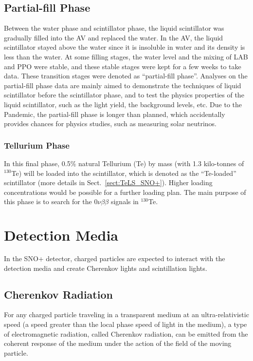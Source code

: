 \subsection{Partial-fill Phase} \label{sect:partialPhase}
Between the water phase and scintillator phase, the liquid scintillator was gradually filled into the AV and replaced the water. In the AV, the liquid scintillator stayed above the water since it is insoluble in water and its density is less than the water. At some filling stages, the water level and the mixing of LAB and PPO were stable, and these stable stages were kept for a few weeks to take data. These transition stages were denoted as ``partial-fill phase''. Analyses on the partial-fill phase data are mainly aimed to demonstrate the techniques of liquid scintillator before the scintillator phase, and to test the physics properties of the liquid scintillator, such as the light yield, the background levels, etc. Due to the Pandemic, the partial-fill phase is longer than planned, which accidentally provides chances for physics studies, such as measuring solar neutrinos.

\subsubsection{Tellurium Phase} \label{sect:tePhase}
In this final phase, 0.5\% natural Tellurium (Te) by mass (with 1.3 kilo-tonnes of $^{130}$Te) will be loaded into the scintillator, which is denoted as the ``Te-loaded'' scintillator (more details in Sect.~\ref{sect:TeLS_SNO+}). Higher loading concentrations would be possible for a further loading plan\cite{Paton:2019kgy}. The main purpose of this phase is to search for the $0\nu\beta\beta$ signals in $^{130}$Te.

\section{Detection Media} \label{sect:detectionMedia}
In the SNO+ detector, charged particles are expected to interact with the detection media and create Cherenkov lights and scintillation lights. 

\subsection{Cherenkov Radiation}\label{sect:cherenkov}
For any charged particle traveling in a transparent medium at an ultra-relativistic speed (a speed greater than the local phase speed of light in the medium), a type of electromagnetic radiation, called Cherenkov radiation, can be emitted from the coherent response of the medium under the action of the field of the moving particle\cite{jackson2007classical,landau2013electrodynamics}.

